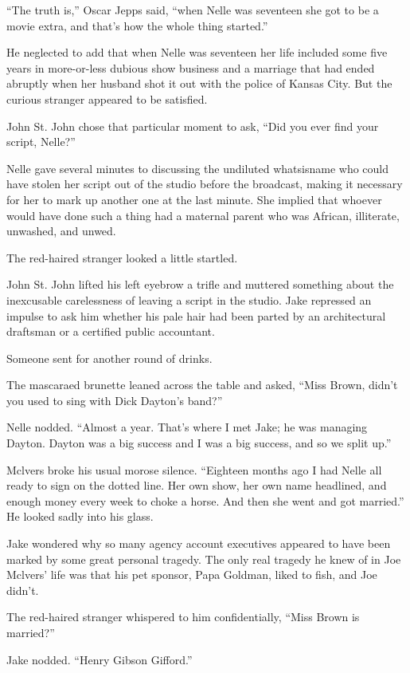 \documentclass{novel}
\begin{document}
“The truth is,” Oscar Jepps said, “when Nelle was seventeen she got to be a movie extra, and that’s how the whole thing started.”

He neglected to add that when Nelle was seventeen her life included some five years in more-or-less dubious show business and a marriage that had ended abruptly when her husband shot it out with the police of Kansas City. But the curious stranger appeared to be satisfied.

John St. John chose that particular moment to ask, “Did you ever find your script, Nelle?”

Nelle gave several minutes to discussing the undiluted whatsisname who could have stolen her script out of the studio before the broadcast, making it necessary for her to mark up another one at the last minute. She implied that whoever would have done such a thing had a maternal parent who was African, illiterate, unwashed, and unwed.

The red-haired stranger looked a little startled.

John St. John lifted his left eyebrow a trifle and muttered something about the inexcusable carelessness of leaving a script in the studio. Jake repressed an impulse to ask him whether his pale hair had been parted by an architectural draftsman or a certified public accountant.

Someone sent for another round of drinks.

The mascaraed brunette leaned across the table and asked, “Miss Brown, didn’t you used to sing with Dick Dayton’s band?”

Nelle nodded. “Almost a year. That’s where I met Jake; he was managing Dayton. Dayton was a big success and I was a big success, and so we split up.”

Mclvers broke his usual morose silence. “Eighteen months ago I had Nelle all ready to sign on the dotted line. Her own show, her own name headlined, and enough money every week to choke a horse. And then she went and got married.” He looked sadly into his glass.

Jake wondered why so many agency account executives appeared to have been marked by some great personal tragedy. The only real tragedy he knew of in Joe Mclvers’ life was that his pet sponsor, Papa Goldman, liked to fish, and Joe didn’t.

The red-haired stranger whispered to him confidentially, “Miss Brown is married?”

Jake nodded. “Henry Gibson Gifford.”
\end{document}
